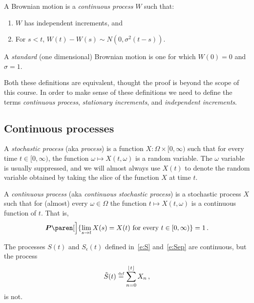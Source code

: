 \begin{definition}
  A Brownian motion is a \emph{continuous process} $W$ such that:
  \begin{enumerate}
    \item
       $W$ has independent increments, and
    \item
      For $s < t$, $W(t) - W(s) \sim N(0, \sigma^2 (t - s))$.
  \end{enumerate}
\end{definition}
\begin{remark}
  A \emph{standard} (one dimensional) Brownian motion is one for which $W(0) = 0$ and $\sigma = 1$.
\end{remark}

Both these definitions are equivalent, thought the proof is beyond the scope of this course.
In order to make sense of these definitions we need to define the terms \emph{continuous process}, \emph{stationary increments}, and \emph{independent increments}.

\subsection{Continuous processes}
\begin{definition}
  A \emph{stochastic process} (aka \emph{process}) is a function $X\colon \Omega \times [0, \infty)$ such that for every time $t \in [0, \infty)$, the function $\omega \mapsto X(t, \omega)$ is a random variable.
  The $\omega$ variable is usually suppressed, and we will almost always use $X(t)$ to denote the random variable obtained by taking the slice of the function $X$ at time $t$.
\end{definition}

\begin{definition}
  A \emph{continuous process} (aka \emph{continuous stochastic process}) is a stochastic process $X$ such that for (almost) every $\omega \in \Omega$ the function $t \mapsto X(t, \omega)$ is a continuous function of $t$.
  That is, 
  \begin{equation*}
    \P\paren[\Big]{ \lim_{s \to t} X(s) = X(t) \text{ for every } t \in [0, \infty) }
    = 1\,.
  \end{equation*}
\end{definition}


The processes $S(t)$ and $S_\epsilon(t)$ defined in~\eqref{e:S} and~\eqref{e:Sep} are continuous, but the process
\begin{equation*}
  \tilde S(t) \stackrel{\scriptscriptstyle\textup{def}}{=} \sum_{n=0}^{\lfloor t\rfloor} X_n \,,
\end{equation*}
is not.

